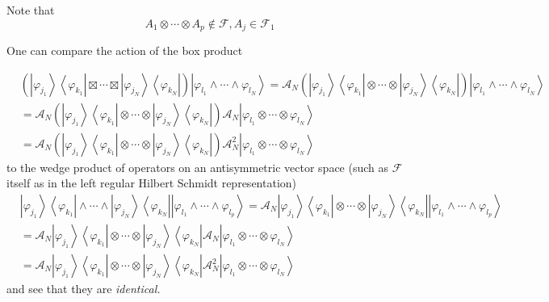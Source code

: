 \documentclass[aps,preprint]{revtex4}%
\begin{document}
Note that
\begin{equation}
A_{1}\otimes\cdots\otimes A_{p}\notin\mathcal{F},A_{j}\in\mathcal{F}_{1}%
\end{equation}


One can compare the action of the box product%

\begin{align}
&  \left(  \left\vert \varphi_{j_{1}}\right\rangle \left\langle \varphi
_{k_{1}}\right\vert \boxtimes\cdots\boxtimes\left\vert \varphi_{j_{N}%
}\right\rangle \left\langle \varphi_{k_{N}}\right\vert \right)  \left\vert
\varphi_{l_{1}}\wedge\cdots\wedge\varphi_{l_{N}}\right\rangle =\mathcal{A}%
_{N}\left(  \left\vert \varphi_{j_{1}}\right\rangle \left\langle
\varphi_{k_{1}}\right\vert \otimes\cdots\otimes\left\vert \varphi_{j_{N}%
}\right\rangle \left\langle \varphi_{k_{N}}\right\vert \right)  \left\vert
\varphi_{l_{1}}\wedge\cdots\wedge\varphi_{l_{N}}\right\rangle \\
&  =\mathcal{A}_{N}\left(  \left\vert \varphi_{j_{1}}\right\rangle
\left\langle \varphi_{k_{1}}\right\vert \otimes\cdots\otimes\left\vert
\varphi_{j_{N}}\right\rangle \left\langle \varphi_{k_{N}}\right\vert \right)
\mathcal{A}_{N}\left\vert \varphi_{l_{1}}\otimes\cdots\otimes\varphi_{l_{N}%
}\right\rangle \\
&  =\mathcal{A}_{N}\left(  \left\vert \varphi_{j_{1}}\right\rangle
\left\langle \varphi_{k_{1}}\right\vert \otimes\cdots\otimes\left\vert
\varphi_{j_{N}}\right\rangle \left\langle \varphi_{k_{N}}\right\vert \right)
\mathcal{A}_{N}^{2}\left\vert \varphi_{l_{1}}\otimes\cdots\otimes
\varphi_{l_{N}}\right\rangle
\end{align}
to the wedge product of operators on an antisymmetric vector space (such as
$\mathcal{F}$ itself as in the left regular Hilbert Schmidt representation)
\begin{align}
&  \left\vert \varphi_{j_{1}}\right\rangle \left\langle \varphi_{k_{1}%
}\right\vert \wedge\cdots\wedge\left\vert \varphi_{j_{N}}\right\rangle
\left\langle \varphi_{k_{N}}\right\vert \left\vert \varphi_{l_{1}}\wedge
\cdots\wedge\varphi_{l_{p}}\right\rangle =\mathcal{A}_{N}\left\vert
\varphi_{j_{1}}\right\rangle \left\langle \varphi_{k_{1}}\right\vert
\otimes\cdots\otimes\left\vert \varphi_{j_{N}}\right\rangle \left\langle
\varphi_{k_{N}}\right\vert \left\vert \varphi_{l_{1}}\wedge\cdots\wedge
\varphi_{l_{p}}\right\rangle \\
&  =\mathcal{A}_{N}\left\vert \varphi_{j_{1}}\right\rangle \left\langle
\varphi_{k_{1}}\right\vert \otimes\cdots\otimes\left\vert \varphi_{j_{N}%
}\right\rangle \left\langle \varphi_{k_{N}}\right\vert \mathcal{A}%
_{N}\left\vert \varphi_{l_{1}}\otimes\cdots\otimes\varphi_{l_{N}}\right\rangle
\\
&  =\mathcal{A}_{N}\left\vert \varphi_{j_{1}}\right\rangle \left\langle
\varphi_{k_{1}}\right\vert \otimes\cdots\otimes\left\vert \varphi_{j_{N}%
}\right\rangle \left\langle \varphi_{k_{N}}\right\vert \mathcal{A}_{N}%
^{2}\left\vert \varphi_{l_{1}}\otimes\cdots\otimes\varphi_{l_{N}%
}\right\rangle
\end{align}
and see that they are \emph{identical. }
\end{document}

